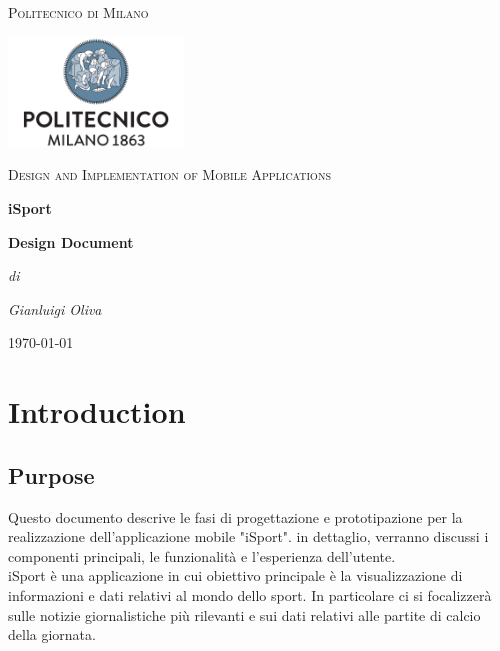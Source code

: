 \documentclass[numbers=noenddot, 12pt, a4paper, oneside]{scrbook}
\begin{document}
\begin{titlepage}
	\centering
	{\scshape\LARGE Politecnico di Milano \par}
	\vspace{1cm}
	\includegraphics[width=0.35\textwidth]{polimi-logo}\par
	\vspace{1cm}

	{\scshape\Large Design and Implementation of Mobile Applications\par}
	\vspace{1.5cm}
	{\huge\bfseries iSport \par}
	\vspace{1cm}
	{\Large\bfseries Design Document \par}
	\vspace{3cm}
	{\Large\itshape di\par}
	{\Large\itshape Gianluigi Oliva\par}
	\vspace{1.5cm}
	\vfill
	


	\vfill

	{\large \today\par}
\end{titlepage}

\newpage
\tableofcontents
\newpage


\chapter{Introduction}

\section{Purpose}
Questo documento descrive le fasi di progettazione e prototipazione per la realizzazione dell'applicazione mobile "iSport". in dettaglio, verranno discussi i componenti principali, le funzionalità e l'esperienza dell'utente.\\

iSport è una applicazione in cui obiettivo principale è la visualizzazione di informazioni e dati relativi al mondo dello sport. In particolare ci si focalizzerà sulle notizie giornalistiche più rilevanti e sui dati relativi alle partite di calcio della giornata.\\
\end{document}
